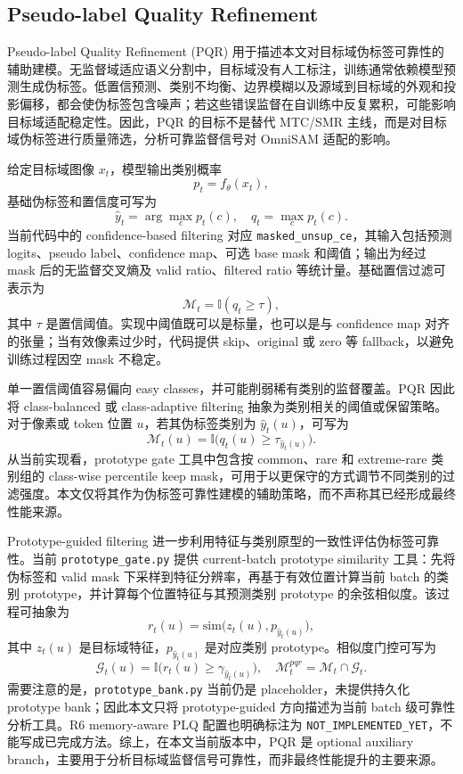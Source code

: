 \subsection{Pseudo-label Quality Refinement}
Pseudo-label Quality Refinement (PQR) 用于描述本文对目标域伪标签可靠性的辅助建模。无监督域适应语义分割中，目标域没有人工标注，训练通常依赖模型预测生成伪标签。低置信预测、类别不均衡、边界模糊以及源域到目标域的外观和投影偏移，都会使伪标签包含噪声；若这些错误监督在自训练中反复累积，可能影响目标域适配稳定性。因此，PQR 的目标不是替代 MTC/SMR 主线，而是对目标域伪标签进行质量筛选，分析可靠监督信号对 OmniSAM 适配的影响。

给定目标域图像 $x_t$，模型输出类别概率
\[
p_t = f_{\theta}(x_t),
\]
基础伪标签和置信度可写为
\[
\hat{y}_t = \arg\max_c p_t(c), \quad q_t = \max_c p_t(c).
\]
当前代码中的 confidence-based filtering 对应 \texttt{masked\_unsup\_ce}，其输入包括预测 logits、pseudo label、confidence map、可选 base mask 和阈值；输出为经过 mask 后的无监督交叉熵及 valid ratio、filtered ratio 等统计量。基础置信过滤可表示为
\[
\mathcal{M}_t = \mathbb{I}(q_t \geq \tau),
\]
其中 $\tau$ 是置信阈值。实现中阈值既可以是标量，也可以是与 confidence map 对齐的张量；当有效像素过少时，代码提供 skip、original 或 zero 等 fallback，以避免训练过程因空 mask 不稳定。

单一置信阈值容易偏向 easy classes，并可能削弱稀有类别的监督覆盖。PQR 因此将 class-balanced 或 class-adaptive filtering 抽象为类别相关的阈值或保留策略。对于像素或 token 位置 $u$，若其伪标签类别为 $\hat{y}_t(u)$，可写为
\[
\mathcal{M}_t(u) = \mathbb{I}\big(q_t(u) \geq \tau_{\hat{y}_t(u)}\big).
\]
从当前实现看，prototype gate 工具中包含按 common、rare 和 extreme-rare 类别组的 class-wise percentile keep mask，可用于以更保守的方式调节不同类别的过滤强度。本文仅将其作为伪标签可靠性建模的辅助策略，而不声称其已经形成最终性能来源。

Prototype-guided filtering 进一步利用特征与类别原型的一致性评估伪标签可靠性。当前 \texttt{prototype\_gate.py} 提供 current-batch prototype similarity 工具：先将伪标签和 valid mask 下采样到特征分辨率，再基于有效位置计算当前 batch 的类别 prototype，并计算每个位置特征与其预测类别 prototype 的余弦相似度。该过程可抽象为
\[
r_t(u) = \mathrm{sim}\big(z_t(u), p_{\hat{y}_t(u)}\big),
\]
其中 $z_t(u)$ 是目标域特征，$p_{\hat{y}_t(u)}$ 是对应类别 prototype。相似度门控可写为
\[
\mathcal{G}_t(u) = \mathbb{I}\big(r_t(u) \geq \gamma_{\hat{y}_t(u)}\big), \quad
\mathcal{M}^{pqr}_t = \mathcal{M}_t \cap \mathcal{G}_t.
\]
需要注意的是，\texttt{prototype\_bank.py} 当前仍是 placeholder，未提供持久化 prototype bank；因此本文只将 prototype-guided 方向描述为当前 batch 级可靠性分析工具。R6 memory-aware PLQ 配置也明确标注为 \texttt{NOT\_IMPLEMENTED\_YET}，不能写成已完成方法。综上，在本文当前版本中，PQR 是 optional auxiliary branch，主要用于分析目标域监督信号可靠性，而非最终性能提升的主要来源。

